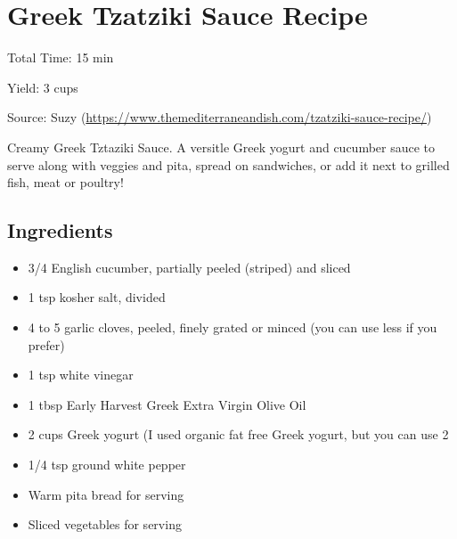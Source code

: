 \section{Greek Tzatziki Sauce Recipe}

\begin{center}
Total Time: 15 min

\noindent Yield: 3 cups

\vspace{1em}

    Source: Suzy (\url{https://www.themediterraneandish.com/tzatziki-sauce-recipe/})

    Creamy Greek Tztaziki Sauce.
    A versitle Greek yogurt and cucumber sauce to serve along with veggies and pita, spread on sandwiches, or add it next to grilled fish, meat or poultry!
\end{center}

\subsection{Ingredients}
\begin{multicols}{2}
\begin{itemize}
    \item 3/4 English cucumber, partially peeled (striped) and sliced
    \item 1 tsp kosher salt, divided
    \item 4 to 5 garlic cloves, peeled, finely grated or minced (you can use less if you prefer)
    \item 1 tsp white vinegar
    \item 1 tbsp Early Harvest  Greek Extra Virgin Olive Oil
    \item 2 cups Greek yogurt (I used organic fat free Greek yogurt, but you can use 2%
    \item 1/4 tsp ground white pepper
    \item Warm pita bread for serving
    \item Sliced vegetables for serving
\end{itemize}
\end{multicols}

